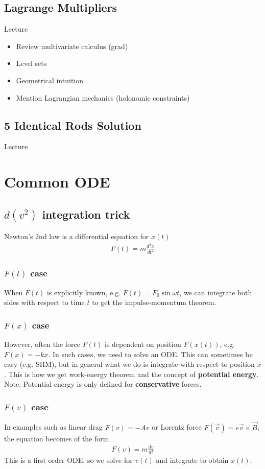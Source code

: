 \documentclass{article}
\begin{document}
\subsection{Lagrange Multipliers}
Lecture
\begin{itemize}
    \item Review multivariate calculus (grad)
    \item Level sets 
    \item Geometrical intuition
    \item Mention Lagrangian mechanics (holonomic constraints)
\end{itemize}
\subsection{5 Identical Rods Solution}
Lecture
\section{Common ODE}
\subsection{$d(v^2)$ integration trick}
Newton's 2nd law is a differential equation for $x(t)$
\begin{align}
    F(t) = m \frac{d^2 x}{dt^2}
\end{align}
\subsubsection{$F(t)$ case}
When $F(t)$ is explicitly known, e.g. $F(t) = F_0 \sin \omega t$, we can integrate both sides with respect to time $t$ to get the impulse-momentum theorem.
\subsubsection{$F(x)$ case}
However, often the force $F(t)$ is dependent on position $F(x(t))$, e.g. $F(x) = -kx$. In such cases, we need to solve an ODE. This can sometimes be easy (e.g. SHM), but in general what we do is integrate with respect to position $x$. This is how we get work-energy theorem and the concept of \textbf{potential energy}. \\[10pt]
Note: Potential energy is only defined for \textbf{conservative} forces.
\subsubsection{$F(v)$ case}
In examples such as linear drag $F(v) = -Av$ or Lorentz force $F(\vec{v}) = e\vec{v} \times \vec{B}$, the equation becomes of the form
\begin{align}
    F(v) = m \frac{dv}{dt}
\end{align}
This is a first order ODE, so we solve for $v(t)$ and integrate to obtain $x(t)$.
\end{document}
